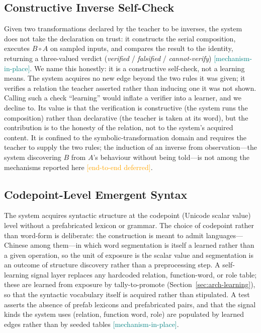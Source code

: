 \documentclass[11pt,a4paper]{article}
\newcommand{\statusmech}{\textcolor{teal}{\small\textsf{[mechanism-in-place]}}}
\newcommand{\statusdeferred}{\textcolor{orange}{\small\textsf{[end-to-end deferred]}}}
\begin{document}
\subsection{Constructive Inverse Self-Check}
\label{sec:mech-inverse}
Given two transformations declared by the teacher to be inverses, the
system does not take the declaration on trust: it constructs the serial
composition, executes $B \circ A$ on sampled inputs, and compares the
result to the identity, returning a three-valued verdict
(\emph{verified} / \emph{falsified} / \emph{cannot-verify}) \statusmech.
We name this honestly: it is a constructive self-check, not a learning
means. The system acquires no new edge beyond the two rules it was
given; it verifies a relation the teacher asserted rather than inducing
one it was not shown. Calling such a check ``learning'' would inflate a
verifier into a learner, and we decline to. Its value is that the
verification is constructive (the system runs the composition) rather
than declarative (the teacher is taken at its word), but the
contribution is to the honesty of the relation, not to the system's
acquired content. It is confined to the symbolic-transformation domain
and requires the teacher to supply the two rules; the induction of an
inverse from observation---the system discovering $B$ from $A$'s
behaviour without being told---is not among the mechanisms reported here
\statusdeferred.

\subsection{Codepoint-Level Emergent Syntax}
The system acquires syntactic structure at the codepoint (Unicode scalar
value) level without a prefabricated lexicon or grammar. The choice of
codepoint rather than word-form is deliberate: the construction is meant
to admit languages---Chinese among them---in which word segmentation is
itself a learned rather than a given operation, so the unit of exposure
is the scalar value and segmentation is an outcome of structure
discovery rather than a preprocessing step. A self-learning signal layer
replaces any hardcoded relation, function-word, or role table; these are
learned from exposure by tally-to-promote
(Section~\ref{sec:arch-learning}), so that the syntactic vocabulary
itself is acquired rather than stipulated. A test asserts the absence of
prefab lexicons and prefabricated pairs, and that the signal kinds the
system uses (relation, function word, role) are populated by learned
edges rather than by seeded tables \statusmech.
\end{document}
